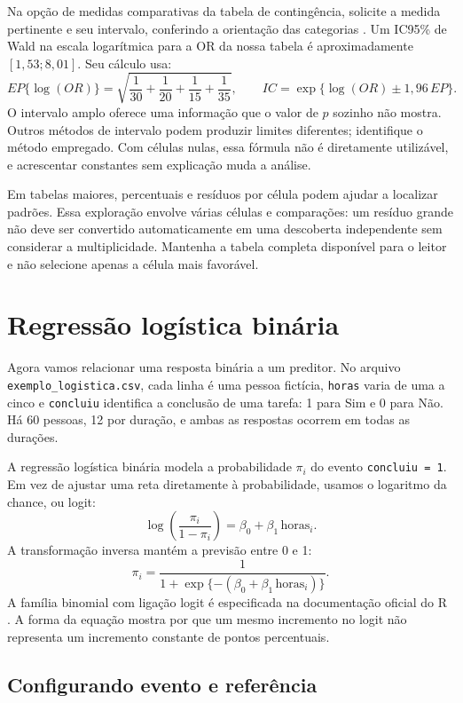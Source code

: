 Na opção de medidas comparativas da tabela de contingência, solicite a medida pertinente e seu intervalo, conferindo a orientação das categorias \parencite{JamoviContingencia}. Um IC95\% de Wald na escala logarítmica para a OR da nossa tabela é aproximadamente $[1{,}53;8{,}01]$. Seu cálculo usa:
\[
EP\{\log(OR)\}=\sqrt{\frac1{30}+\frac1{20}+\frac1{15}+\frac1{35}},
\qquad
IC=\exp\{\log(OR)\pm1{,}96\,EP\}.
\]
O intervalo amplo oferece uma informação que o valor de $p$ sozinho não mostra. Outros métodos de intervalo podem produzir limites diferentes; identifique o método empregado. Com células nulas, essa fórmula não é diretamente utilizável, e acrescentar constantes sem explicação muda a análise.

Em tabelas maiores, percentuais e resíduos por célula podem ajudar a localizar padrões. Essa exploração envolve várias células e comparações: um resíduo grande não deve ser convertido automaticamente em uma descoberta independente sem considerar a multiplicidade. Mantenha a tabela completa disponível para o leitor e não selecione apenas a célula mais favorável.

\section{Regressão logística binária}
\label{sec:logistica}

Agora vamos relacionar uma resposta binária a um preditor. No arquivo \texttt{exemplo\_logistica.csv}, cada linha é uma pessoa fictícia, \texttt{horas} varia de uma a cinco e \texttt{concluiu} identifica a conclusão de uma tarefa: 1 para Sim e 0 para Não. Há 60 pessoas, 12 por duração, e ambas as respostas ocorrem em todas as durações.

A regressão logística binária modela a probabilidade $\pi_i$ do evento \texttt{concluiu = 1}. Em vez de ajustar uma reta diretamente à probabilidade, usamos o logaritmo da chance, ou logit:
\[
\log\left(\frac{\pi_i}{1-\pi_i}\right)
=\beta_0+\beta_1\,\text{horas}_i.
\]
A transformação inversa mantém a previsão entre 0 e 1:
\[
\pi_i=\frac{1}{1+\exp\{-(\beta_0+\beta_1\,\text{horas}_i)\}}.
\]
A família binomial com ligação logit é especificada na documentação oficial do R \parencite{RFamilias}. A forma da equação mostra por que um mesmo incremento no logit não representa um incremento constante de pontos percentuais.

\subsection{Configurando evento e referência}

